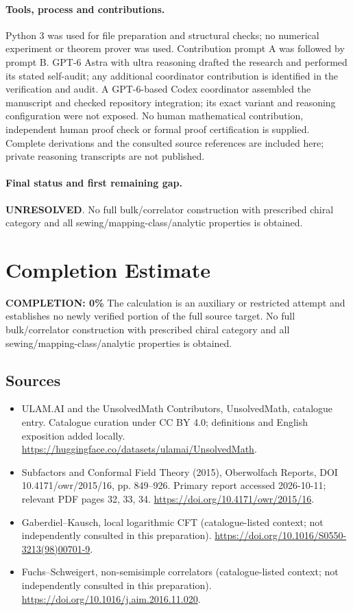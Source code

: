 \documentclass[11pt]{article}
\begin{document}
\paragraph{Tools, process and contributions.}
Python 3 was used for file preparation and structural checks; no numerical experiment or theorem prover was used. Contribution prompt A was followed by prompt B. GPT-6 Astra with ultra reasoning drafted the research and performed its stated self-audit; any additional coordinator contribution is identified in the verification and audit. A GPT-6-based Codex coordinator assembled the manuscript and checked repository integration; its exact variant and reasoning configuration were not exposed. No human mathematical contribution, independent human proof check or formal proof certification is supplied. Complete derivations and the consulted source references are included here; private reasoning transcripts are not published.

\paragraph{Final status and first remaining gap.}
\textbf{UNRESOLVED}. No full bulk/correlator construction with prescribed chiral category and all sewing/mapping-class/analytic properties is obtained.

\section{Completion Estimate}
\noindent\textbf{COMPLETION: 0\%}
The calculation is an auxiliary or restricted attempt and establishes no newly verified portion of the full source target. No full bulk/correlator construction with prescribed chiral category and all sewing/mapping-class/analytic properties is obtained.

\subsection{Sources}
\begin{itemize}
\item[\hypertarget{source:statement:1}{S1}] ULAM.AI and the UnsolvedMath Contributors, UnsolvedMath, catalogue entry. Catalogue curation under CC BY 4.0; definitions and English exposition added locally.
\url{https://huggingface.co/datasets/ulamai/UnsolvedMath}.
\item[\hypertarget{source:statement:2}{S2}] Subfactors and Conformal Field Theory (2015), Oberwolfach Reports, DOI 10.4171/owr/2015/16, pp. 849--926. Primary report accessed 2026-10-11; relevant PDF pages 32, 33, 34.
\url{https://doi.org/10.4171/owr/2015/16}.
\item[\hypertarget{source:statement:3}{S3}] Gaberdiel--Kausch, local logarithmic CFT (catalogue-listed context; not independently consulted in this preparation).
\url{https://doi.org/10.1016/S0550-3213(98)00701-9}.
\item[\hypertarget{source:statement:4}{S4}] Fuchs--Schweigert, non-semisimple correlators (catalogue-listed context; not independently consulted in this preparation).
\url{https://doi.org/10.1016/j.aim.2016.11.020}.
\end{itemize}
\label{end:statement}
\end{document}
